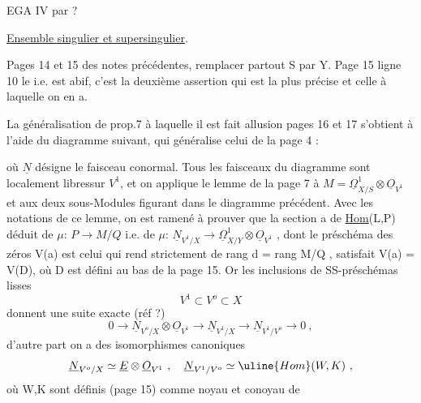 \placedmargin{//}  

\placedmargin{(}EGA IV par ?

\uline{Ensemble singulier et supersingulier}.

Pages 14 et 15 des notes précédentes, remplacer partout S par Y. Page
15 ligne 10 le i.e. est abif, c'est la deuxième assertion qui est la
plus précise et celle à laquelle on en a.

La généralisation de prop.7 à laquelle il est fait allusion pages 16
et 17 s'obtient à l'aide du diagramme suivant, qui généralise celui de la
page 4 :

où $\underline{N}$ désigne le faisceau conormal. Tous les faisceaux du diagramme sont
localement libressur $V^1$, et on applique le lemme de la page 7 à $M=\underline{\Omega}^1_{X/S}\otimes\underline{O}_{V^1}$
et aux deux sous-Modules figurant dans le diagramme précédent. Avec
les notations de ce lemme, on est ramené à prouver que la section a
 de \uline{Hom}(L,P) déduit de $\mu$: $P\rightarrow M/Q$ i.e. de $\mu$: $\underline{N}_{V^1/X}\longrightarrow\underline{\Omega}^1_{X/Y}\otimes\underline{O}_{V^1}$ ,
dont le préschéma des zéros V(a) est celui qui rend \hand{$\mu$} strictement de rang
\hand{$<$} d = rang M/Q , satisfait V(a) = V(D), où D est défini au bas de la
page 15. Or les inclusions de SS-préschémas lisses
\placedmargin{||}
\[ V^1 \subset V^o \subset X \]
donnent une suite exacte (réf ?)
\[ 0 \rightarrow \underline{N}_{V^o/X}\otimes\underline{O}_{V^1} \rightarrow \underline{N}_{V^1/X} \longrightarrow \underline{N}_{V^1/V^o} \rightarrow 0 \ , \]
d'autre part on a des isomorphismes canoniques
\[ \underline{N}_{V^o/X} \simeq \underline{E}\otimes\underline{O}_{V^1} \ , \quad \underline{N}_{V^1/V^o} \simeq \uline{Hom}(W,K) \ , \]
où W,K sont définis (page 15) comme noyau et conoyau de

